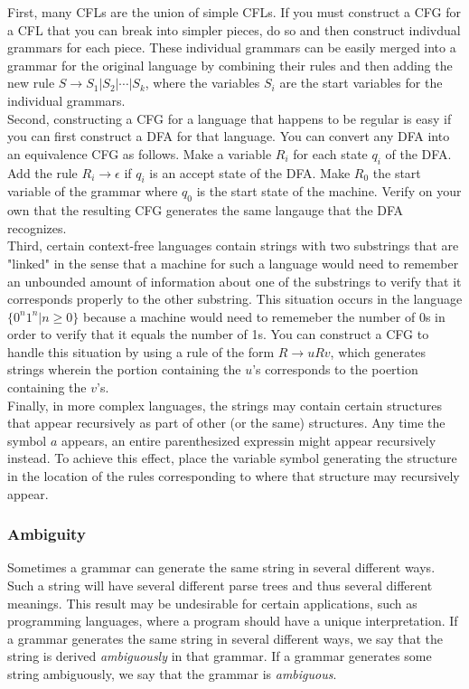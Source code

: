 \documentclass{article}
\begin{document}
First, many CFLs are the union of simple CFLs. If you must construct a CFG for a CFL that you can break into simpler pieces, do so and then construct indivdual grammars for each piece. These individual grammars can be easily merged into a grammar for the original language by combining their rules and then adding the new rule $S \rightarrow S_1 \vert S_2 \vert \cdots \vert S_k$, where the variables $S_i$ are the start variables for the individual grammars. \\ 

Second, constructing a CFG for a language that happens to be regular is easy if you can first construct a DFA for that language. You can convert any DFA into an equivalence CFG as follows. Make a variable $R_i$ for each state $q_i$ of the DFA. Add the rule $R_i \rightarrow \epsilon$ if $q_i$ is an accept state of the DFA. Make $R_0$ the start variable of the grammar where $q_0$ is the start state of the machine. Verify on your own that the resulting CFG generates the same langauge that the DFA recognizes. \\ 

Third, certain context-free languages contain strings with two substrings that are "linked" in the sense that a machine for such a language would need to remember an unbounded amount of information about one of the substrings to verify that it corresponds properly to the other substring. This situation occurs in the language $\{0^n 1^n \vert n \geq 0\}$ because a machine would need to rememeber the number of 0s in order to verify that it equals the number of 1s. You can construct a CFG to handle this situation by using a rule of the form $R \rightarrow uRv$, which generates strings wherein the portion containing the $u$'s corresponds to the poertion containing the $v$'s. \\ 

Finally, in more complex languages, the strings may contain certain structures that appear recursively as part of other (or the same) structures. Any time the symbol $a$ appears, an entire parenthesized expressin might appear recursively instead. To achieve this effect, place the variable symbol generating the structure in the location of the rules corresponding to where that structure may recursively appear. 

\subsubsection{Ambiguity}

Sometimes a grammar can generate the same string in several different ways. Such a string will have several different parse trees and thus several different meanings. This result may be undesirable for certain applications, such as programming languages, where a program should have a unique interpretation. If a grammar generates the same string in several different ways, we say that the string is derived \emph{ambiguously} in that grammar. If a grammar generates some string ambiguously, we say that the grammar is \emph{ambiguous}. \\ 
\end{document}

